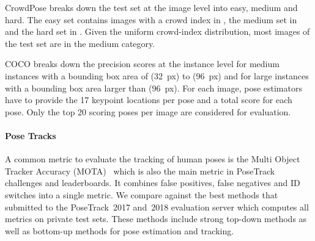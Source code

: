 \documentclass[journal]{IEEEtran}
\begin{document}
CrowdPose breaks down the test set at the image level into easy, medium and hard.
The easy set
contains images with a crowd index in , the medium set in 
and the hard set in . Given the uniform crowd-index distribution,
most images of the test set are in the medium category.

COCO breaks down the precision scores at the instance level for medium
instances with a bounding
box area of (32~px) to (96~px) and for large instances with a bounding
box area larger than (96~px).
For each image, pose estimators have to provide the 17 keypoint locations per pose
and a total score for each pose. Only the top 20 scoring poses per image
are considered for evaluation.



\paragraph{Pose Tracks}
A common metric to evaluate the tracking of human poses is the Multi Object
Tracker Accuracy (MOTA)~\cite{bernardin2008evaluating,milan2016mot16} which
is also the main metric in PoseTrack challenges and leaderboards.
It combines false positives, false negatives and ID switches into a single
metric.
We compare against the best methods that submitted to the
PoseTrack~2017 and~2018 evaluation server which computes all metrics on private
test sets. These methods include strong top-down methods as well as
bottom-up methods for pose estimation and tracking.
\end{document}
